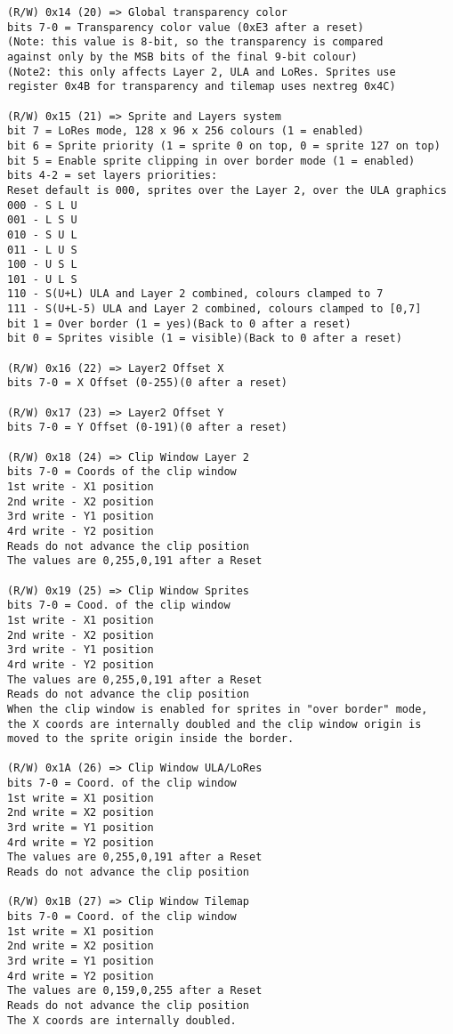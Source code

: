 \begin{verbatim}
(R/W) 0x14 (20) => Global transparency color
bits 7-0 = Transparency color value (0xE3 after a reset)
(Note: this value is 8-bit, so the transparency is compared
against only by the MSB bits of the final 9-bit colour)
(Note2: this only affects Layer 2, ULA and LoRes. Sprites use
register 0x4B for transparency and tilemap uses nextreg 0x4C)

(R/W) 0x15 (21) => Sprite and Layers system
bit 7 = LoRes mode, 128 x 96 x 256 colours (1 = enabled)
bit 6 = Sprite priority (1 = sprite 0 on top, 0 = sprite 127 on top)
bit 5 = Enable sprite clipping in over border mode (1 = enabled)
bits 4-2 = set layers priorities:
Reset default is 000, sprites over the Layer 2, over the ULA graphics
000 - S L U
001 - L S U
010 - S U L
011 - L U S
100 - U S L
101 - U L S
110 - S(U+L) ULA and Layer 2 combined, colours clamped to 7
111 - S(U+L-5) ULA and Layer 2 combined, colours clamped to [0,7]
bit 1 = Over border (1 = yes)(Back to 0 after a reset)
bit 0 = Sprites visible (1 = visible)(Back to 0 after a reset)

(R/W) 0x16 (22) => Layer2 Offset X
bits 7-0 = X Offset (0-255)(0 after a reset)

(R/W) 0x17 (23) => Layer2 Offset Y
bits 7-0 = Y Offset (0-191)(0 after a reset)

(R/W) 0x18 (24) => Clip Window Layer 2
bits 7-0 = Coords of the clip window
1st write - X1 position
2nd write - X2 position
3rd write - Y1 position
4rd write - Y2 position
Reads do not advance the clip position
The values are 0,255,0,191 after a Reset

(R/W) 0x19 (25) => Clip Window Sprites
bits 7-0 = Cood. of the clip window
1st write - X1 position
2nd write - X2 position
3rd write - Y1 position
4rd write - Y2 position
The values are 0,255,0,191 after a Reset
Reads do not advance the clip position
When the clip window is enabled for sprites in "over border" mode,
the X coords are internally doubled and the clip window origin is
moved to the sprite origin inside the border.

(R/W) 0x1A (26) => Clip Window ULA/LoRes
bits 7-0 = Coord. of the clip window
1st write = X1 position
2nd write = X2 position
3rd write = Y1 position
4rd write = Y2 position
The values are 0,255,0,191 after a Reset
Reads do not advance the clip position

(R/W) 0x1B (27) => Clip Window Tilemap
bits 7-0 = Coord. of the clip window
1st write = X1 position
2nd write = X2 position
3rd write = Y1 position
4rd write = Y2 position
The values are 0,159,0,255 after a Reset
Reads do not advance the clip position
The X coords are internally doubled.


\end{verbatim}
